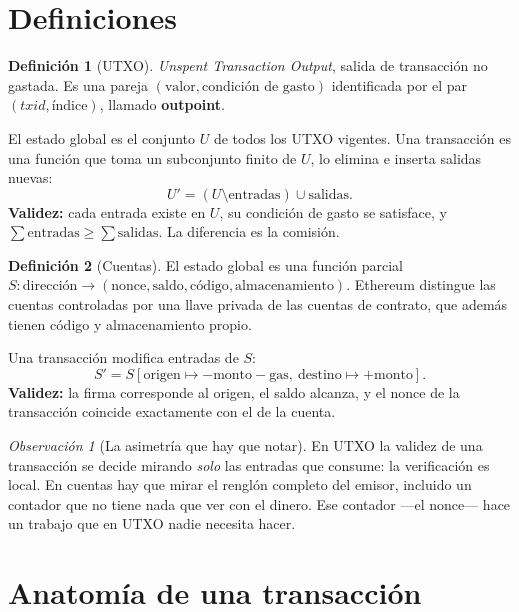 \documentclass[11pt,a4paper]{article}
\theoremstyle{definition}
\newtheorem{definicion}{Definición}
\theoremstyle{plain}
\theoremstyle{remark}
\newtheorem*{observacion}{Observación}
\begin{document}
\section{Definiciones}\label{sec:def}

\begin{definicion}[UTXO]
\emph{Unspent Transaction Output}, salida de transacción no gastada. Es una
pareja $(\text{valor}, \text{condición de gasto})$ identificada por el par
$(\textit{txid}, \text{índice})$, llamado \textbf{outpoint}.

El estado global es el conjunto $U$ de todos los UTXO vigentes. Una transacción
es una función que toma un subconjunto finito de $U$, lo elimina e inserta
salidas nuevas:
\[
  U' = (U \setminus \text{entradas}) \cup \text{salidas}.
\]
\textbf{Validez:} cada entrada existe en $U$, su condición de gasto se satisface,
y $\sum \text{entradas} \ge \sum \text{salidas}$. La diferencia es la comisión.
\end{definicion}

\begin{definicion}[Cuentas]
El estado global es una función parcial
$S: \text{dirección} \to (\text{nonce}, \text{saldo}, \text{código}, \text{almacenamiento})$.
Ethereum distingue las cuentas controladas por una llave privada de las cuentas
de contrato, que además tienen código y almacenamiento propio.

Una transacción modifica entradas de $S$:
\[
  S' = S[\text{origen} \mapsto -\text{monto}-\text{gas},\ \text{destino} \mapsto +\text{monto}].
\]
\textbf{Validez:} la firma corresponde al origen, el saldo alcanza, y el nonce de
la transacción coincide exactamente con el de la cuenta.
\end{definicion}

\begin{observacion}[La asimetría que hay que notar]
En UTXO la validez de una transacción se decide mirando \emph{solo} las entradas
que consume: la verificación es local. En cuentas hay que mirar el renglón
completo del emisor, incluido un contador que no tiene nada que ver con el
dinero. Ese contador —el nonce— hace un trabajo que en UTXO nadie necesita hacer.
\end{observacion}

\section{Anatomía de una transacción}\label{sec:anatomia}
\end{document}
